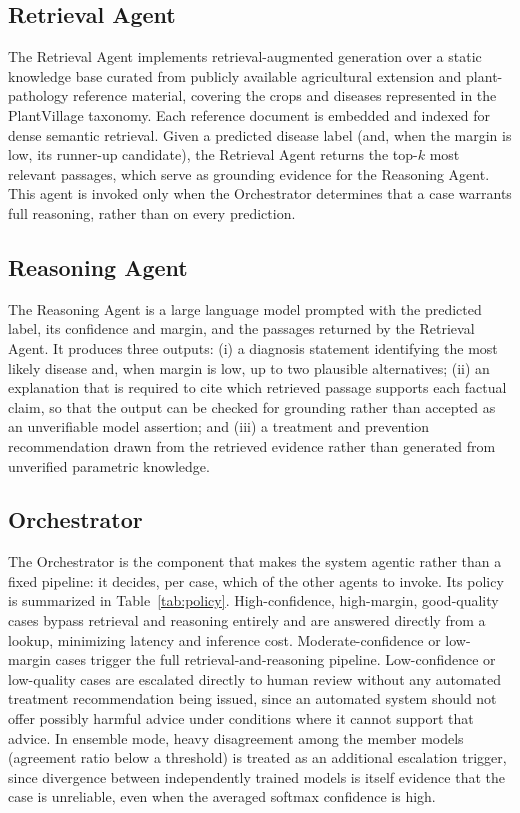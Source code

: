 \documentclass[conference]{IEEEtran}
\begin{document}
\subsection{Retrieval Agent}
The Retrieval Agent implements retrieval-augmented generation over a static knowledge base curated from publicly available agricultural extension and plant-pathology reference material, covering the crops and diseases represented in the PlantVillage taxonomy. Each reference document is embedded and indexed for dense semantic retrieval. Given a predicted disease label (and, when the margin is low, its runner-up candidate), the Retrieval Agent returns the top-$k$ most relevant passages, which serve as grounding evidence for the Reasoning Agent. This agent is invoked only when the Orchestrator determines that a case warrants full reasoning, rather than on every prediction.

\subsection{Reasoning Agent}
The Reasoning Agent is a large language model prompted with the predicted label, its confidence and margin, and the passages returned by the Retrieval Agent. It produces three outputs: (i) a diagnosis statement identifying the most likely disease and, when margin is low, up to two plausible alternatives; (ii) an explanation that is required to cite which retrieved passage supports each factual claim, so that the output can be checked for grounding rather than accepted as an unverifiable model assertion; and (iii) a treatment and prevention recommendation drawn from the retrieved evidence rather than generated from unverified parametric knowledge.

\subsection{Orchestrator}
The Orchestrator is the component that makes the system agentic rather than a fixed pipeline: it decides, per case, which of the other agents to invoke. Its policy is summarized in Table~\ref{tab:policy}. High-confidence, high-margin, good-quality cases bypass retrieval and reasoning entirely and are answered directly from a lookup, minimizing latency and inference cost. Moderate-confidence or low-margin cases trigger the full retrieval-and-reasoning pipeline. Low-confidence or low-quality cases are escalated directly to human review without any automated treatment recommendation being issued, since an automated system should not offer possibly harmful advice under conditions where it cannot support that advice. In ensemble mode, heavy disagreement among the member models (agreement ratio below a threshold) is treated as an additional escalation trigger, since divergence between independently trained models is itself evidence that the case is unreliable, even when the averaged softmax confidence is high.
\end{document}
